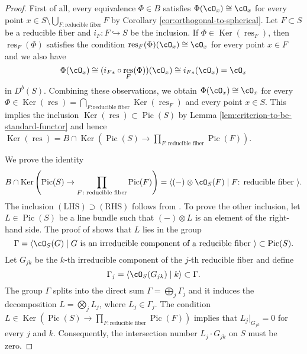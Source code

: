 \documentclass[12pt]{amsart}
\numberwithin{equation}{section}
\theoremstyle{plain}
\theoremstyle{definition}
\DeclareMathOperator{\Pic}{\mathrm{Pic}}
\DeclareMathOperator{\Ker}{\mathrm{Ker}}
\DeclareMathOperator{\res}{\mathrm{res}}
\begin{document}
\begin{proof}
    First of all, every equivalence $\Phi \in B$ satisfies $\Phi(\cO_x) \cong \cO_x$ for every point $x \in S \setminus \bigcup_{F \colon \text{reducible fiber}}F$ by Corollary \ref{cor:orthogonal-to-spherical}.
    Let $F \subset S$ be a reducible fiber and $i_F \colon F \hookrightarrow S$ be the inclusion.
    If $\Phi \in \Ker(\res_F)$, then $\res_F(\Phi)$ satisfies the condition $\res_F(\Phi)(\cO_x) \cong \cO_x$ for every point $x \in F$ and we also have
    \begin{equation}
        \Phi(\cO_x) \cong (i_{F*} \circ \res_F(\Phi))(\cO_x) \cong i_{F*}(\cO_x) = \cO_x
    \end{equation}
    in $D^b(S)$.
    Combining these observations, we obtain $\Phi(\cO_x) \cong \cO_x$ for every $\Phi \in \Ker(\res) = \bigcap_{F \colon \text{reducible fiber}} \Ker(\res_F)$ and every point $x \in S$.
    This implies the inclusion $\Ker(\res) \subset \Pic(S)$ by Lemma \ref{lem:criterion-to-be-standard-functor} and hence $\Ker(\res) = B \cap \Ker \left(\Pic(S) \to \prod_{F \colon \text{reducible fiber}} \Pic(F)\right)$.

    We prove the identity
    \begin{equation}\label{eq:kernel-of-res}
        B \cap \Ker \left(\Pic(S) \to \prod_{F \colon \text{reducible fiber}} \Pic(F)\right) = \langle (-) \otimes \cO_S(F) \mid F \text{: reducible fiber }\rangle.
    \end{equation}
    The inclusion $(\text{LHS}) \supset (\text{RHS})$ follows from \cite[Lemma 4.15 (i)(2)]{MR2198807}.
    To prove the other inclusion, let $L \in \Pic(S)$ be a line bundle such that $(-) \otimes L$ is an element of the right-hand side.
    The proof of \cite[Lemma 4.18 (i)]{MR2198807} shows that $L$ lies in the group
    \begin{equation}
        \Gamma = \langle \cO_S(G) \mid G \text{ is an irreducible component of a reducible fiber }\rangle \subset \Pic(S).
    \end{equation}
    Let $G_{jk}$ be the $k$-th irreducible component of the $j$-th reducible fiber and define
    \begin{equation}
        \Gamma_j = \langle \cO_S(G_{jk}) \mid k  \rangle \subset \Gamma.
    \end{equation}
    The group $\Gamma$ splits into the direct sum $\Gamma = \bigoplus_{j} \Gamma_j$ and it induces the decomposition $L = \bigotimes_{j} L_j$, where $L_j \in \Gamma_j$.
    The condition $L \in \Ker(\Pic(S) \to \prod_{F \colon \text{reducible fiber}} \Pic(F))$ implies that $L_j \lvert_{G_{jk}} = 0$ for every $j$ and $k$.
    Consequently, the intersection number $L_j \cdot G_{jk}$ on $S$ must be zero.


\end{proof}
\end{document}
